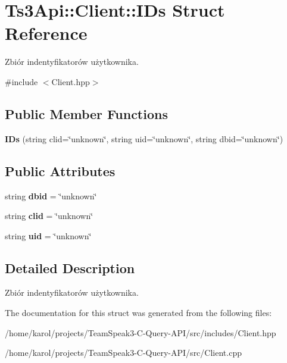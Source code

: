 \hypertarget{struct_ts3_api_1_1_client_1_1_i_ds}{}\section{Ts3\+Api\+:\+:Client\+:\+:I\+Ds Struct Reference}
\label{struct_ts3_api_1_1_client_1_1_i_ds}


Zbiór indentyfikatorów użytkownika.  




{\ttfamily \#include $<$Client.\+hpp$>$}

\subsection*{Public Member Functions}
\begin{DoxyCompactItemize}
\item 
{\bfseries I\+Ds} (string clid=\char`\"{}unknown\char`\"{}, string uid=\char`\"{}unknown\char`\"{}, string dbid=\char`\"{}unknown\char`\"{})\hypertarget{struct_ts3_api_1_1_client_1_1_i_ds_a09b63cd33e2cda211b9602331fcbc479}{}\label{struct_ts3_api_1_1_client_1_1_i_ds_a09b63cd33e2cda211b9602331fcbc479}

\end{DoxyCompactItemize}
\subsection*{Public Attributes}
\begin{DoxyCompactItemize}
\item 
string {\bfseries dbid} = \char`\"{}unknown\char`\"{}\hypertarget{struct_ts3_api_1_1_client_1_1_i_ds_a24bc7b82dce19a9aedbc44cd3962da29}{}\label{struct_ts3_api_1_1_client_1_1_i_ds_a24bc7b82dce19a9aedbc44cd3962da29}

\item 
string {\bfseries clid} = \char`\"{}unknown\char`\"{}\hypertarget{struct_ts3_api_1_1_client_1_1_i_ds_a9629faff180a32d054f11316a5accd0d}{}\label{struct_ts3_api_1_1_client_1_1_i_ds_a9629faff180a32d054f11316a5accd0d}

\item 
string {\bfseries uid} = \char`\"{}unknown\char`\"{}\hypertarget{struct_ts3_api_1_1_client_1_1_i_ds_aea719a541ce3791f6753e3acf25b9b64}{}\label{struct_ts3_api_1_1_client_1_1_i_ds_aea719a541ce3791f6753e3acf25b9b64}

\end{DoxyCompactItemize}


\subsection{Detailed Description}
Zbiór indentyfikatorów użytkownika. 

The documentation for this struct was generated from the following files\+:\begin{DoxyCompactItemize}
\item 
/home/karol/projects/\+Team\+Speak3-\/\+C-\/\+Query-\/\+A\+P\+I/src/includes/Client.\+hpp\item 
/home/karol/projects/\+Team\+Speak3-\/\+C-\/\+Query-\/\+A\+P\+I/src/Client.\+cpp\end{DoxyCompactItemize}
